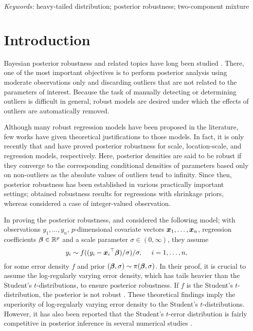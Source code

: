 \documentclass[12pt]{article}
\def\si{{\sigma}}
\def\si{{\sigma}}
\def\si{{\sigma}}
\def\bbe{{\text{\boldmath $\beta$}}}
\def\x{{\text{\boldmath $x$}}}
\begin{document}
\noindent%
{\it Keywords:}  heavy-tailed distribution; posterior robustness; two-component mixture 
\vfill

\newpage
%
\section{Introduction}
\label{sec:introduction}
Bayesian posterior robustness \citep{o1979outlier} and related topics have long been studied \citep[e.g.,][]{west1984outlier, andrade2006bayesian, andrade2011bayesian, op2012}. 
%
There, one of the most important objectives is to perform posterior analysis using moderate observations only and discarding outliers that are not related to the parameters of interest. 
Because the task of manually detecting or determining outliers is difficult in general, robust models are desired under which the effects of outliers are automatically removed. 

Although many robust regression models have been proposed in the literature, few works \citep[e.g.,][]{o1979outlier} %
have given theoretical justifications to those models. 
In fact, it is only recently that \cite{desgagne2013, desgagne2015robustness} 
%
and \cite{Gag2019} %
have proved posterior robustness for scale, location-scale, and regression models, respectively. Here, posterior densities are said to be robust if they converge to the corresponding conditional densities of parameters based only on non-outliers as the absolute values of outliers tend to infinity. 
Since then, posterior robustness has been established in various practically important settings; \cite{hamura2020log} %
obtained robustness results for regressions with shrinkage priors, whereas \cite{his2021} %
considered a case of integer-valued observation. 


In proving the posterior robustness, \cite{Gag2019} and \cite{hamura2020log} 
%
considered the following model; with observations $y_1 , \dots , y_n$, $p$-dimensional covariate vectors $\x_1,\dots ,\x_n$, regression coefficients $\bbe \in \mathbb{R} ^p$ and a scale parameter $\si \in (0, \infty )$, they assume
\begin{align} 
\label{eq:model_1} 
y_i\sim  f (( y_i - {\x _i}^{\top } \bbe ) / \si ) / \si, \ \ \ \ i=1,\ldots,n,
%
\end{align}
for some error density $f$ and prior $( \bbe , \si ) \sim \pi ( \bbe , \si )$. 
%
In their proof, it is crucial to assume the log-regularly varying error density, which has tails heavier than the Student's $t$-distributions, to ensure posterior robustness. If $f$ is the Student's $t$-distribution, the posterior is not robust \citep{gh2023}. These theoretical findings imply the superiority of log-regularly varying error density to the Student's $t$-distributions. However, it has also been reported that the Student's $t$-error distribution is fairly competitive in posterior inference in several numerical studies \citep{hamura2020log}. 
\end{document}
